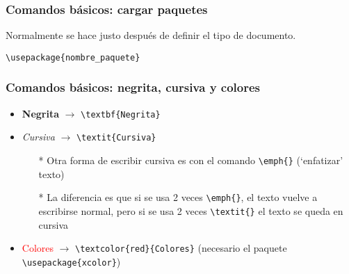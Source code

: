 
\begin{frame}[fragile]
\frametitle{Comandos básicos: cargar paquetes}
Normalmente se hace justo después de definir el tipo de documento. 

\vspace{0.5cm}

\verb|\usepackage{nombre_paquete}|
\end{frame}

\begin{frame}[fragile]
\frametitle{Comandos básicos: negrita, cursiva y colores}
\begin{itemize}
    \item \textbf{Negrita} $\rightarrow$ \verb|\textbf{Negrita}|
    \item \textit{Cursiva} $\rightarrow$ \verb|\textit{Cursiva}|
    \begin{itemize}
        \item [*] Otra forma de escribir cursiva es con el comando \verb|\emph{}| (`enfatizar' texto)
        \item [*] La diferencia es que si se usa 2 veces \verb|\emph{}|, el texto vuelve a escribirse normal, pero si se usa 2 veces \verb|\textit{}| el texto se queda en cursiva
    \end{itemize}
    \item \textcolor{red}{Colores} $\rightarrow$ \verb|\textcolor{red}{Colores}| (necesario el paquete \verb|\usepackage{xcolor}|)
\end{itemize}

\end{frame}

